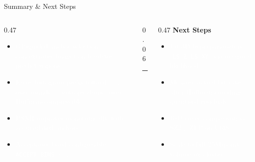\documentclass[aspectratio=169, 11pt]{beamer}
\begin{document}
{
\begin{frame}{Summary \& Next Steps}
\begin{columns}[T, totalwidth=\textwidth]

  \begin{column}{0.47\textwidth}
    \begin{itemize}\setlength\itemsep{8pt}
      \item[\textcolor{cmint}{$\checkmark$}]
            \textcolor{white}{GP-guided anchor selection concentrates budget on
            hard-to-predict regions}
      \item[\textcolor{cmint}{$\checkmark$}]
            \textcolor{white}{Error histogram peaks toward $\pm\varepsilon_b$ over rounds
            — entropy drops, more Huffman-compressible}
      \item[\textcolor{cmint}{$\checkmark$}]
            \textcolor{white}{PSNR improves monotonically with accumulated anchors}
      \item[\textcolor{cmint}{$\checkmark$}]
            \textcolor{white}{Acceptance band configurable:
            \texttt{ACCEPT\_BINS} $\times\,\varepsilon_b$}
    \end{itemize}
  \end{column}

  \begin{column}{0.06\textwidth}
    \color{cteal}\rule{1pt}{0.75\textheight}
  \end{column}

  \begin{column}{0.47\textwidth}
    {\bfseries\color{cmid} Next Steps}\medskip
    \begin{itemize}\setlength\itemsep{8pt}
      \item[\textcolor{cmint}{$\to$}]
            \textcolor{white}{Fit 3D hyperparameters (\texttt{LS\_Z}, \texttt{LS\_XY})
            via marginal likelihood}
      \item[\textcolor{cmint}{$\to$}]
            \textcolor{white}{Measure actual bit rate after Huffman encoding quantised
            residuals}
      \item[\textcolor{cmint}{$\to$}]
            \textcolor{white}{R-D curve comparison vs SZ2 / ZFP on Uf48}
      \item[\textcolor{cmint}{$\to$}]
            \textcolor{white}{Scale to full 25M-point volume on cluster}
    \end{itemize}
  \end{column}

\end{columns}
\end{frame}
}
\end{document}
